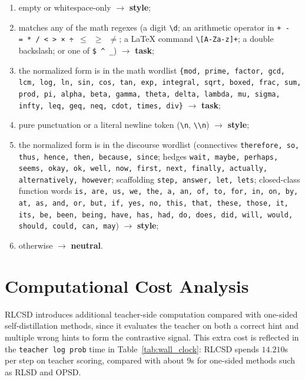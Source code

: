   \begin{enumerate}
  \itemsep0em
  \item[(1)] empty or whitespace-only $\rightarrow$ \textbf{style};
  \item[(2)] matches any of the math regexes
             (a digit \texttt{\textbackslash d};
              an arithmetic operator in
              \texttt{+\,-\,=\,*\,/\,<\,>\,×\,÷\,$\leq$\,$\geq$\,$\neq$};
              a LaTeX command \texttt{\textbackslash[A-Za-z]+};
              a double backslash;
              or one of \texttt{\$\,\textasciicircum\,\_})
             $\rightarrow$ \textbf{task};
  \item[(3)] the normalized form is in the math wordlist
             \texttt{\{mod, prime, factor, gcd, lcm, log, ln, sin, cos,
             tan, exp, integral, sqrt, boxed, frac, sum, prod, pi, alpha,
             beta, gamma, theta, delta, lambda, mu, sigma, infty, leq,
             geq, neq, cdot, times, div\}}
             $\rightarrow$ \textbf{task};
  \item[(4)] pure punctuation or a literal newline token
             ({\tt \textbackslash n}, {\tt \textbackslash\textbackslash n})
             $\rightarrow$ \textbf{style};
  \item[(5)] the normalized form is in the discourse wordlist
             (connectives \texttt{therefore, so, thus, hence, then, because,
             since}; hedges \texttt{wait, maybe, perhaps, seems, okay, ok,
             well, now, first, next, finally, actually, alternatively,
             however}; scaffolding \texttt{step, answer, let, lets};
             closed-class function words \texttt{is, are, us, we, the, a,
             an, of, to, for, in, on, by, at, as, and, or, but, if, yes,
             no, this, that, these, those, it, its, be, been, being, have,
             has, had, do, does, did, will, would, should,
             could, can, may})
             $\rightarrow$ \textbf{style};
  \item[(6)] otherwise $\rightarrow$ \textbf{neutral}.
  \end{enumerate}


\section{Computational Cost Analysis}

RLCSD introduces additional teacher-side computation compared with one-sided self-distillation methods, since it evaluates the teacher on both a correct hint and multiple wrong hints to form the contrastive signal. This extra cost is reflected in the \texttt{teacher log prob} time in Table~\ref{tab:wall_clock}: RLCSD spends \(14.210\)s per step on teacher scoring, compared with about \(9\)s for one-sided methods such as RLSD and OPSD.

